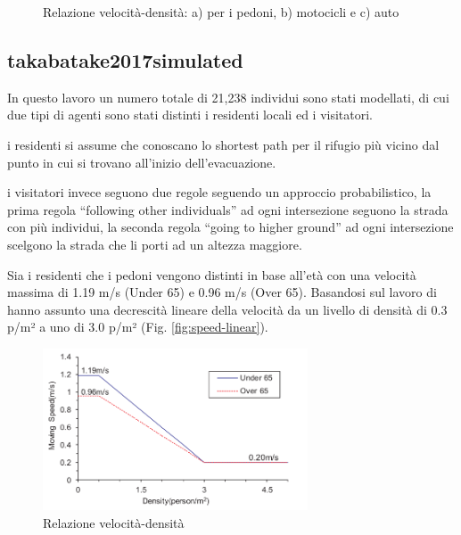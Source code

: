 \begin{figure}[ht]
\begin{subfigure}{0.45\textwidth}
        \caption{}
        \label{fig:wrsnjds}
    \end{subfigure}
    \caption{Relazione velocità-densità: a) per i pedoni, b) motocicli e c) auto}
    \label{fig:ankdasndk}
\end{figure}



\subsection{takabatake2017simulated}
In questo lavoro un numero totale di 21,238 individui sono stati modellati, 
di cui due tipi di agenti sono stati distinti i residenti locali ed i visitatori.

\vspace*{5mm}

i residenti si assume che conoscano lo shortest path
per il rifugio più vicino dal punto in cui si trovano all'inizio dell'evacuazione.

\vspace*{5mm}

i visitatori invece seguono due regole seguendo un approccio probabilistico,
la prima regola “following other individuals” ad ogni intersezione seguono la strada con più individui,
la seconda regola “going to higher ground” ad ogni intersezione scelgono la strada che li porti ad un altezza maggiore.

\vspace*{5mm}

Sia i residenti che i pedoni vengono distinti in base all'età con una velocità massima di 1.19 m/s (Under 65) e 0.96 m/s (Over 65).
Basandosi sul lavoro di \textcite[]{older1968movement} hanno assunto una decrescità lineare della 
velocità da un livello di densità di 0.3 p/m² a uno di 3.0 p/m² (Fig. \ref{fig:speed-linear}).

\vspace*{5mm}

\begin{figure}[ht]
    \centering
    \includegraphics[width=0.7\textwidth]{images/speed_Linear.png}
    \caption{Relazione velocità-densità \textcite[]{takabatake2017simulated}}
    \label{fig:speed-linear2}
\end{figure}

